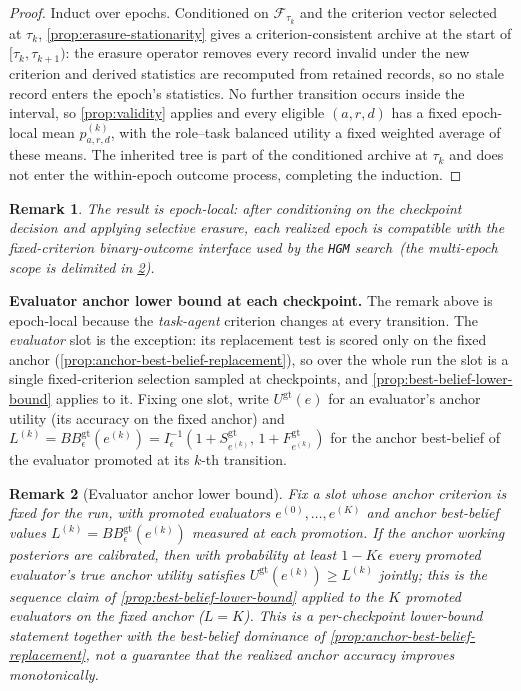 \documentclass{paper}
\newtheorem{remark}{Remark}
\newcommand{\hgm}{\texttt{HGM}\xspace}
\begin{document}
\begin{proof}
Induct over epochs. Conditioned on \(\mathcal F_{\tau_k}\) and the criterion vector selected at \(\tau_k\), \cref{prop:erasure-stationarity} gives a criterion-consistent archive at the start of \([\tau_k,\tau_{k+1})\): the erasure operator removes every record invalid under the new criterion and derived statistics are recomputed from retained records, so no stale record enters the epoch's statistics. No further transition occurs inside the interval, so \cref{prop:validity} applies and every eligible \((a,r,d)\) has a fixed epoch-local mean \(p_{a,r,d}^{(k)}\), with the role--task balanced utility a fixed weighted average of these means. The inherited tree is part of the conditioned archive at \(\tau_k\) and does not enter the within-epoch outcome process, completing the induction.
\end{proof}

\begin{remark}
The result is epoch-local: after conditioning on the checkpoint decision and applying selective erasure, each realized epoch is compatible with the fixed-criterion binary-outcome interface used by the \hgm search~(the multi-epoch scope is delimited in \cref{prop:evaluator-trajectory}).
\end{remark}

\noindent\textbf{Evaluator anchor lower bound at each checkpoint.}
The remark above is epoch-local because the \emph{task-agent} criterion changes at every transition. The \emph{evaluator} slot is the exception: its replacement test is scored only on the fixed anchor (\cref{prop:anchor-best-belief-replacement}), so over the whole run the slot is a single fixed-criterion selection sampled at checkpoints, and \cref{prop:best-belief-lower-bound} applies to it. Fixing one slot, write \(U^{\mathrm{gt}}(e)\) for an evaluator's anchor utility (its accuracy on the fixed anchor) and \(L^{(k)}=BB_\epsilon^{\mathrm{gt}}(e^{(k)})=I^{-1}_\epsilon(1+S^{\mathrm{gt}}_{e^{(k)}},\,1+F^{\mathrm{gt}}_{e^{(k)}})\) for the anchor best-belief of the evaluator promoted at its \(k\)-th transition.

\begin{remark}[Evaluator anchor lower bound]
\label{prop:evaluator-trajectory}
Fix a slot whose anchor criterion is fixed for the run, with promoted evaluators \(e^{(0)},\dots,e^{(K)}\) and anchor best-belief values \(L^{(k)}=BB_\epsilon^{\mathrm{gt}}(e^{(k)})\) measured at each promotion. If the anchor working posteriors are calibrated, then with probability at least \(1-K\epsilon\) every promoted evaluator's true anchor utility satisfies \(U^{\mathrm{gt}}(e^{(k)})\ge L^{(k)}\) jointly; this is the sequence claim of \cref{prop:best-belief-lower-bound} applied to the \(K\) promoted evaluators on the fixed anchor (\(L=K\)). This is a per-checkpoint lower-bound statement together with the best-belief dominance of \cref{prop:anchor-best-belief-replacement}, not a guarantee that the realized anchor accuracy improves monotonically.
\end{remark}
\end{document}
